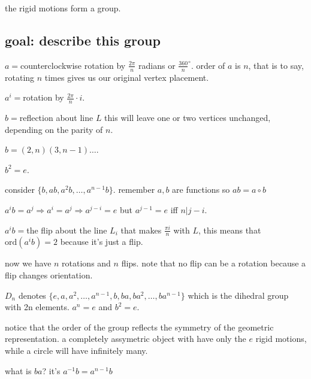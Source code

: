\documentclass[letterpaper]{article}
\begin{document}
the rigid motions form a group.
\subsection*{goal: describe this group}
$a=$counterclockwise rotation by $\frac{2\pi}{n}$ radians or $\frac{360}{n}^\circ$. order of $a$ is $n$, that is to say, rotating $n$ times gives us our original vertex placement.

$a^i=$rotation by $\frac{2\pi}{n}\cdot i$.

$b=$reflection about line $L$ this will leave one or two vertices unchanged, depending on the parity of $n$.

$b=(2,n)(3,n-1)\dots$.

$b^2=e$.

consider $\{b,ab,a^2b,\dots,a^{n-1}b\}$. remember $a,b$ are functions so $ab=a\circ b$

$a^ib=a^j\Rightarrow a^i=a^j\Rightarrow a^{j-i}=e$ but $a^{j-1}=e$ iff $n|j-i$.

$a^ib=$the flip about the line $L_i$ that makes $\frac{\pi i}{n}$ with $L$, this means that $\text{ord}(a^ib)=2$ because it's just a flip.

now we have $n$ rotations and $n$ flips. note that no flip can be a rotation because a flip changes orientation.

$D_n$ denotes $\{e,a,a^2,\dots,a^{n-1},b,ba,ba^2,\dots,ba^{n-1}\}$ which is the dihedral group with 2n elements. $a^n=e$ and $b^2=e$.

notice that the order of the group reflects the symmetry of the geometric representation. a completely assymetric object with have only the $e$ rigid motions, while a circle will have infinitely many.

what is $ba$? it's $a^{-1}b=a^{n-1}b$
\end{document}
